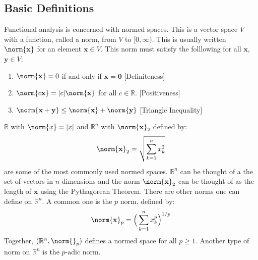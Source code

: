 \documentclass[crop=false,class=book,oneside]{standalone}
\begin{document}
        \subsection{Basic Definitions}
            Functional analysis is concerned with normed spaces.
            This is a vector space $V$ with a function, called
            a norm, from $V$ to $[0,\infty)$. This is usually
            written $\norm{\mathbf{x}}$ for an element
            $\mathbf{x}\in{V}$. This norm must satisfy the
            folllowing for all $\mathbf{x}$, $\mathbf{y}\in{V}$:
            \begin{enumerate}
                \item $\norm{\mathbf{x}}=0$ if and only
                      if $\mathbf{x}=\mathbf{0}$
                      \hfill[Definiteness]
                \item $\norm{c\mathbf{x}}=|c|\norm{\mathbf{x}}$
                      for all $c\in\mathbb{R}$.
                      \hfill[Positiveness]
                \item $\norm{\mathbf{x}+\mathbf{y}}%
                       \leq\norm{\mathbf{x}}+\norm{\mathbf{y}}$
                      \hfill[Triangle Inequality]
            \end{enumerate}
            \begin{example}
                $\mathbb{R}$ with $\norm{x}=|x|$ and
                $\mathbb{R}^{n}$ with $\norm{\mathbf{x}}_{2}$
                defined by:
                \begin{equation*}
                    \norm{\mathbf{x}}_{2}
                    =\sqrt{\sum_{k=1}^{n}x_{k}^{2}}
                \end{equation*}
                are some of the most commonly used normed spaces.
                $\mathbb{R}^{n}$ can be thought of a the set
                of vectors in $n$ dimensions and the norm
                $\norm{\mathbf{x}}_{2}$ can be thought of as
                the length of $\mathbf{x}$ using the
                Pythagorean Theorem. There are other norms one
                can define on $\mathbb{R}^{n}$. A common
                one is the $p$ norm, defined by:
                \begin{equation*}
                    \norm{\mathbf{x}}_{p}
                    =\Big(\sum_{k=1}^{n}x_{k}^{p}\Big)^{1/p}
                \end{equation*}
                Together, $(\mathbb{R}^{n},\norm{}_{p})$ defines
                a normed space for all $p\geq{1}$. Another type
                of norm on $\mathbb{R}^{n}$ is the
                $p\textrm{-adic}$ norm.
            \end{example}
\end{document}
